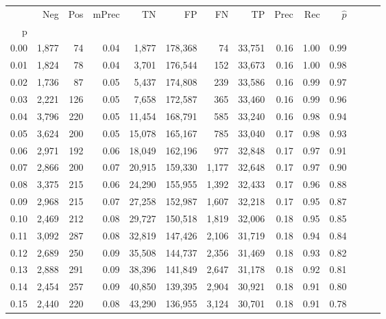 \begin{tabular}{rrrrrrrrrrrrrr}
\toprule
{} &    Neg &  Pos & mPrec &       TN &       FP &      FN &      TP &  Prec &   Rec & $\hat{p}$ \\
p    &        &      &       &          &          &         &         &       &       &           \\
\midrule
0.00 &  1,877 &   74 &  0.04 &    1,877 &  178,368 &      74 &  33,751 &  0.16 &  1.00 &      0.99 \\
0.01 &  1,824 &   78 &  0.04 &    3,701 &  176,544 &     152 &  33,673 &  0.16 &  1.00 &      0.98 \\
0.02 &  1,736 &   87 &  0.05 &    5,437 &  174,808 &     239 &  33,586 &  0.16 &  0.99 &      0.97 \\
0.03 &  2,221 &  126 &  0.05 &    7,658 &  172,587 &     365 &  33,460 &  0.16 &  0.99 &      0.96 \\
0.04 &  3,796 &  220 &  0.05 &   11,454 &  168,791 &     585 &  33,240 &  0.16 &  0.98 &      0.94 \\
0.05 &  3,624 &  200 &  0.05 &   15,078 &  165,167 &     785 &  33,040 &  0.17 &  0.98 &      0.93 \\
0.06 &  2,971 &  192 &  0.06 &   18,049 &  162,196 &     977 &  32,848 &  0.17 &  0.97 &      0.91 \\
0.07 &  2,866 &  200 &  0.07 &   20,915 &  159,330 &   1,177 &  32,648 &  0.17 &  0.97 &      0.90 \\
0.08 &  3,375 &  215 &  0.06 &   24,290 &  155,955 &   1,392 &  32,433 &  0.17 &  0.96 &      0.88 \\
0.09 &  2,968 &  215 &  0.07 &   27,258 &  152,987 &   1,607 &  32,218 &  0.17 &  0.95 &      0.87 \\
0.10 &  2,469 &  212 &  0.08 &   29,727 &  150,518 &   1,819 &  32,006 &  0.18 &  0.95 &      0.85 \\
0.11 &  3,092 &  287 &  0.08 &   32,819 &  147,426 &   2,106 &  31,719 &  0.18 &  0.94 &      0.84 \\
0.12 &  2,689 &  250 &  0.09 &   35,508 &  144,737 &   2,356 &  31,469 &  0.18 &  0.93 &      0.82 \\
0.13 &  2,888 &  291 &  0.09 &   38,396 &  141,849 &   2,647 &  31,178 &  0.18 &  0.92 &      0.81 \\
0.14 &  2,454 &  257 &  0.09 &   40,850 &  139,395 &   2,904 &  30,921 &  0.18 &  0.91 &      0.80 \\
0.15 &  2,440 &  220 &  0.08 &   43,290 &  136,955 &   3,124 &  30,701 &  0.18 &  0.91 &      0.78 \\

\end{tabular}
